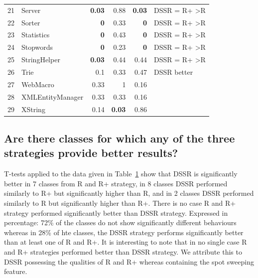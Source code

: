 \documentclass[conference]{IEEEtran}
\begin{document}
\begin{table}[htp]
\begin{tabular}{rlrrrl}
21		&	Server			&	\textbf{0.03}		& 0.88		&\textbf{0.03} 	& DSSR = R+ \textgreater R \\
22		&	Sorter			& 	\textbf{0}			& 0.33		&\textbf{0}		& DSSR = R+ \textgreater R \\
23		&	Statistics			&	\textbf{0}			& 0.43		&\textbf{0}		& DSSR = R+ \textgreater R\\
24		&	Stopwords		&	\textbf{0}			& 0.23		&\textbf{0}		& DSSR = R+ \textgreater R \\
25		&	StringHelper		&	\textbf{0.03}		& 0.44		&0.44		& DSSR = R+ \textgreater R\\
26		& 	Trie				&	0.1				& 0.33		&0.47		& DSSR better \\
27		&	WebMacro		&	0.33				& 1			&0.16		& \\
28		&	XMLEntityManager	&	0.33				& 0.33		&0.16		& \\
29 		&	XString			&	0.14				&\textbf{0.03}	&0.86		& \\


\end{tabular}
\bigskip
\label{table:ttest}
\end{table}





\subsection{Are there classes for which any of the three strategies provide better results?}


T-tests applied to the data given in Table~\ref{table:ttest} show that DSSR is significantly better in 7 classes from R and R+ strategy, in 8 classes DSSR performed similarly to R+  but significantly higher than R, and in 2 classes DSSR performed similarly to R but significantly higher than R+. There is no case R and R+ strategy performed significantly better than DSSR strategy. Expressed in percentage: 72\%  of the classes do not show significantly different behaviours whereas in 28\% of hte classes, the DSSR strategy performs significantly better than at least one of R and R+. It is interesting to note that in no single case R and R+ strategies performed better than DSSR strategy. We attribute this to DSSR possessing the qualities of R and R+ whereas containing the spot sweeping feature.
\end{document}
